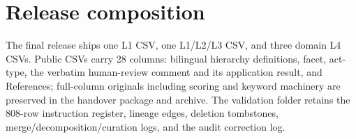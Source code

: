 \documentclass[11pt,a4paper]{article}
\begin{document}
\par\section{Release composition}
The final release ships one L1 CSV, one L1/L2/L3 CSV, and three domain L4 CSVs. Public CSVs carry 28 columns: bilingual hierarchy definitions, facet, act-type, the verbatim human-review comment and its application result, and References; full-column originals including scoring and keyword machinery are preserved in the handover package and archive. The validation folder retains the 808-row instruction register, lineage edges, deletion tombstones, merge/decomposition/curation logs, and the audit correction log.
\end{document}
